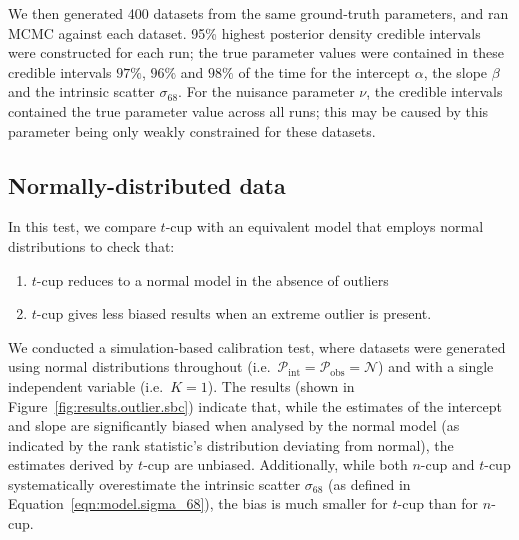 \documentclass[fleqn,usenatbib]{rasti}
\begin{document}
We then generated 400 datasets from the same ground-truth parameters, and ran
MCMC against each dataset.
95\% highest posterior density credible intervals were constructed for each run;
the true parameter values were contained in these credible intervals $97\%$,
$96\%$ and $98\%$ of the time for the intercept $\alpha$, the slope $\beta$ and
the intrinsic scatter $\sigma_{68}$. For the nuisance parameter $\nu$, the
credible intervals contained the true parameter value across all runs; this may
be caused by this parameter being only weakly constrained for these datasets.

\subsection{Normally-distributed data}
\label{sec:results.outlier}

In this test, we compare $t$-cup with an equivalent model that employs normal
distributions to check that:
\begin{enumerate}
    \item $t$-cup reduces to a normal model in the absence of outliers
    \item $t$-cup gives less biased results when an extreme outlier is present.
\end{enumerate}

We conducted a simulation-based calibration test, where datasets were generated
using normal distributions throughout (i.e.\ $\mathcal P_{\text{int}} = \mathcal
P_{\text{obs}} = \mathcal{N}$) and with a single independent variable (i.e.\ $K
= 1$). The results (shown in Figure~\ref{fig:results.outlier.sbc}) indicate
that, while the estimates of the intercept and slope are significantly biased
when analysed by the normal model (as indicated by the rank statistic's
distribution deviating from normal), the estimates derived by $t$-cup are
unbiased. Additionally, while both $n$-cup and $t$-cup systematically
overestimate the intrinsic scatter $\sigma_{68}$ (as defined in
Equation~\ref{eqn:model.sigma_68}), the bias is much smaller for $t$-cup than
for $n$-cup.
\end{document}
